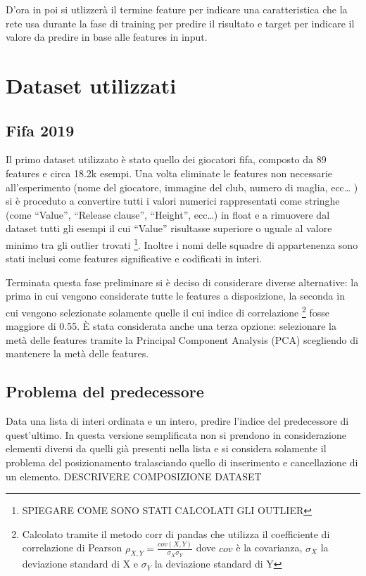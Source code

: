 \documentclass[12pt]{report}
\begin{document}
D'ora in poi si utlizzerà il termine feature per indicare una caratteristica che la rete usa durante la fase di training per predire il risultato e target per indicare il valore da predire in base alle features in input.

\section{Dataset utilizzati}

\subsection{Fifa 2019}

Il primo dataset utilizzato è stato quello dei giocatori fifa, composto da 89 features e circa 18.2k esempi. 
Una volta eliminate le features non necessarie all’esperimento (nome del giocatore, immagine del club, numero di maglia, ecc… ) si è proceduto a convertire tutti i valori numerici rappresentati come stringhe (come “Value”, “Release clause”, “Height”, ecc…) in float e a rimuovere dal dataset tutti gli esempi il cui “Value” risultasse superiore o uguale al valore minimo tra gli outlier trovati \footnote{SPIEGARE COME SONO STATI CALCOLATI GLI OUTLIER}. Inoltre i nomi delle squadre di appartenenza sono stati inclusi come features significative e codificati in interi.

Terminata questa fase preliminare si è deciso di considerare diverse alternative: la prima in cui vengono considerate tutte le features a disposizione, la seconda in cui vengono selezionate solamente quelle il cui indice di correlazione \footnote{Calcolato tramite il metodo corr di pandas che utilizza il coefficiente di correlazione di Pearson $\rho_{X,Y} = \frac{cov(X, Y)}{\sigma_X\sigma_Y}$ dove $cov$ è la covarianza, $\sigma_X$ la deviazione standard di X e $\sigma_Y$ la deviazione standard di Y} fosse maggiore di 0.55.
È stata considerata anche una terza opzione: selezionare la metà delle features tramite la Principal Component Analysis (PCA) scegliendo di mantenere la metà delle features. 

\subsection{Problema del predecessore}\label{probPred}
Data una lista di interi ordinata e un intero, predire l'indice del predecessore di quest'ultimo. In questa versione semplificata non si prendono in considerazione elementi diversi da quelli già presenti nella lista e si considera solamente il problema del posizionamento tralasciando quello di inserimento e cancellazione di un elemento.
DESCRIVERE COMPOSIZIONE DATASET
\end{document}
